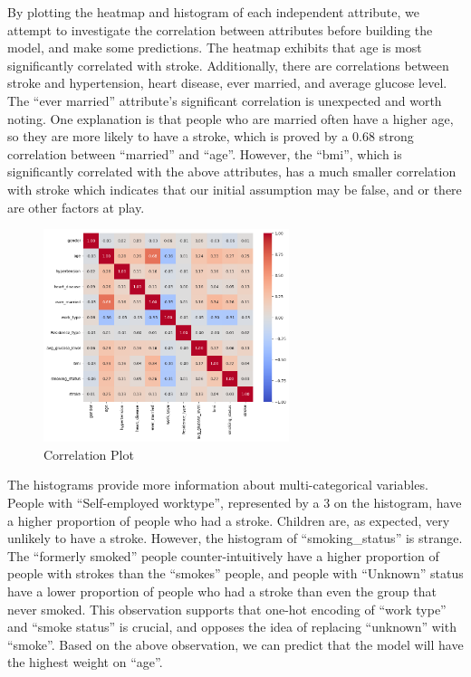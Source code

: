 \documentclass[11pt]{article}
\begin{document}
By plotting the heatmap and histogram of each independent attribute, we attempt to investigate the correlation between attributes before building the model, and make some predictions. The heatmap exhibits that age is most significantly correlated with stroke. Additionally, there are correlations between stroke and hypertension, heart disease, ever married, and average glucose level.  The “ever married” attribute’s significant correlation is unexpected and worth noting. One explanation is that people who are married often have a higher age, so they are more likely to have a stroke, which is proved by a 0.68 strong correlation between “married” and “age”. However, the “bmi”, which is significantly correlated with the above attributes, has a much smaller correlation with stroke which indicates that our initial assumption may be false, and or there are other factors at play.

\begin{figure}[htbp!]
\centering
\includegraphics[width=0.64\textwidth]{CorrelationPlot.png}
\caption{Correlation Plot}
\end{figure}


The histograms provide more information about multi-categorical variables. People with “Self-employed worktype”, represented by a 3 on the histogram, have a higher proportion of people who had a stroke. Children are, as expected, very unlikely to have a stroke. However, the histogram of “smoking\_status” is strange. The “formerly smoked” people counter-intuitively have a higher proportion of people with strokes than the “smokes” people, and people with “Unknown” status have a lower proportion of people who had a stroke than even the group that never smoked. This observation supports that one-hot encoding of “work type” and “smoke status” is crucial, and opposes the idea of replacing “unknown” with “smoke”. 
Based on the above observation, we can predict that the model will have the highest weight on “age”.
\end{document}
